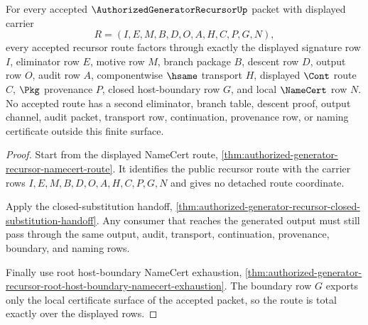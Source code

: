 \begin{theorem}
\label{thm:authorized-generator-recursor-route-totality-lock}
For every accepted $\AuthorizedGeneratorRecursorUp$ packet with displayed carrier
$$
R=(I,E,M,B,D,O,A,H,C,P,G,N),
$$
every accepted recursor route factors through exactly the displayed signature row $I$, eliminator row $E$, motive row $M$, branch package $B$, descent row $D$, output row $O$, audit row $A$, componentwise $\hsame$ transport $H$, displayed $\Cont$ route $C$, $\Pkg$ provenance $P$, closed host-boundary row $G$, and local $\NameCert$ row $N$. No accepted route has a second eliminator, branch table, descent proof, output channel, audit packet, transport row, continuation, provenance row, or naming certificate outside this finite surface.
\end{theorem}
\begin{proof}
Start from the displayed NameCert route, \autoref{thm:authorized-generator-recursor-namecert-route}. It identifies the public recursor route with the carrier rows $I,E,M,B,D,O,A,H,C,P,G,N$ and gives no detached route coordinate.

Apply the closed-substitution handoff, \autoref{thm:authorized-generator-recursor-closed-substitution-handoff}. Any consumer that reaches the generated output must still pass through the same output, audit, transport, continuation, provenance, boundary, and naming rows.

Finally use root host-boundary NameCert exhaustion, \autoref{thm:authorized-generator-recursor-root-host-boundary-namecert-exhaustion}. The boundary row $G$ exports only the local certificate surface of the accepted packet, so the route is total exactly over the displayed rows.
\end{proof}

